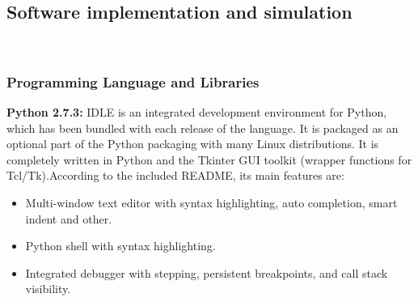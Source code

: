 \documentclass[12pt, a4paper]{article}
\begin{document}
\subsection{Software implementation and simulation}
~\\
\subsubsection{Programming Language and Libraries}
\textbf{Python 2.7.3:} IDLE is an integrated development environment for Python, which has been bundled with each release of the language. It is packaged as an optional part of the Python packaging
with many Linux distributions. It is completely written in Python and the Tkinter GUI
toolkit (wrapper functions for Tcl/Tk).According to the included README, its main
features are:
\begin{itemize}
\item  Multi-window text editor with syntax highlighting, auto completion, smart indent
and other.
\item Python shell with syntax highlighting.
\item Integrated debugger with stepping, persistent breakpoints, and call stack visibility.
\end{itemize}
\end{document}
